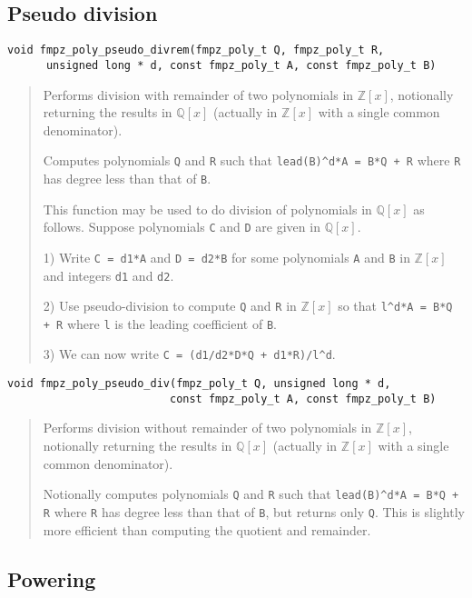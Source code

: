 \documentclass[a4paper,10pt]{article}
\newcommand{\Z}{\mathbb{Z}}
\newcommand{\Q}{\mathbb{Q}}
\newcommand{\code}{\lstinline}
\begin{document}
\subsection{Pseudo division}

\begin{lstlisting}
void fmpz_poly_pseudo_divrem(fmpz_poly_t Q, fmpz_poly_t R, 
      unsigned long * d, const fmpz_poly_t A, const fmpz_poly_t B)
\end{lstlisting}
\begin{quote}
Performs division with remainder of two polynomials in $\Z[x]$, notionally returning the results in $\Q[x]$ (actually in $\Z[x]$ with a single common denominator).

Computes polynomials \code{Q} and \code{R} such that \code{lead(B)^d*A = B*Q + R} where \code{R} has degree less than that of \code{B}.

This function may be used to do division of polynomials in $\Q[x]$ as follows. Suppose polynomials \code{C} and \code{D} are given in $\Q[x]$. 

1) Write \code{C = d1*A} and \code{D = d2*B} for some polynomials \code{A} and \code{B} in $\Z[x]$ and integers \code{d1} and \code{d2}.

2) Use pseudo-division to compute \code{Q} and \code{R} in $\Z[x]$ so that \code{l^d*A = B*Q + R} where \code{l} is the leading coefficient of \code{B}. 

3) We can now write \code{C = (d1/d2*D*Q + d1*R)/l^d}.
\end{quote}

\begin{lstlisting}
void fmpz_poly_pseudo_div(fmpz_poly_t Q, unsigned long * d, 
                         const fmpz_poly_t A, const fmpz_poly_t B)
\end{lstlisting}
\begin{quote}
Performs division without remainder of two polynomials in $\Z[x]$, notionally returning the results in $\Q[x]$ (actually in $\Z[x]$ with a single common denominator).

Notionally computes polynomials \code{Q} and \code{R} such that \code{lead(B)^d*A = B*Q + R} where \code{R} has degree less than that of \code{B}, but returns only \code{Q}. This is slightly more efficient than computing the quotient and remainder.
\end{quote}

\subsection{Powering}
\end{document}
